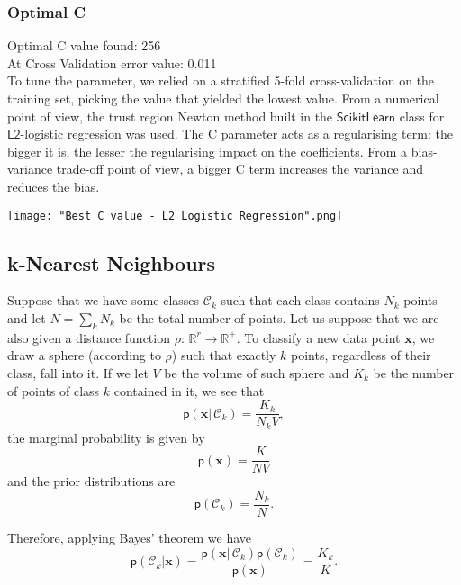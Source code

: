 \documentclass[a4paper]{article}
\begin{document}
\subsubsection{Optimal C}

Optimal C value found: 256\\
At Cross Validation error value: 0.011\\

To tune the parameter, we relied on a stratified 5-fold cross-validation
on the training set, picking the value that yielded the lowest value.
From a numerical point of view, the trust region Newton method built
in the $\mathsf{ScikitLearn}$ class for $\mathsf{L2}$-logistic regression
was used.
The C parameter acts as a regularising term: the bigger it is, the lesser the regularising impact on the coefficients.
From a bias-variance trade-off point of view, a bigger C term increases the variance and reduces the bias.
 

\texttt{[image: "Best C value - L2 Logistic Regression".png]}

\subsection{k-Nearest Neighbours}

Suppose that we have some classes $\mathcal{C}_{k}$ such that each
class contains $N_{k}$ points and let $N=\sum_{k}N_{k}$ be the total
number of points. Let us suppose that we are also given a distance
function $\rho:\,\mathbb{R}^{r}\rightarrow\mathbb{R}^{+}$. To classify
a new data point $\mathbf{x}$, we draw a sphere (according to $\rho$)
such that exactly $k$ points, regardless of their class, fall into
it. If we let $V$ be the volume of such sphere and $K_{k}$ be the
number of points of class $k$ contained in it, we see that 
\begin{equation}
\mathsf{p}\left(\mathbf{x}|\,\mathcal{C}_{k}\right)=\frac{K_{k}}{N_{k}V},\label{eq:-10}
\end{equation}
the marginal probability is given by 
\begin{equation}
\mathsf{p}\left(\mathbf{x}\right)=\frac{K}{NV}\label{eq:-11}
\end{equation}
and the prior distributions are 
\begin{equation}
\mathsf{p}\left(\mathcal{C}_{k}\right)=\frac{N_{k}}{N}.\label{eq:-12}
\end{equation}

Therefore, applying Bayes' theorem we have 
\begin{equation}
\mathsf{p}\left(\mathcal{C}_{k}|\mathbf{x}\right)=\frac{\mathsf{p}\left(\mathbf{x}|\,\mathcal{C}_{k}\right)\mathsf{p}\left(\mathcal{C}_{k}\right)}{\mathsf{p}\left(\mathbf{x}\right)}=\frac{K_{k}}{K}.\label{eq:-13}
\end{equation}
\end{document}
